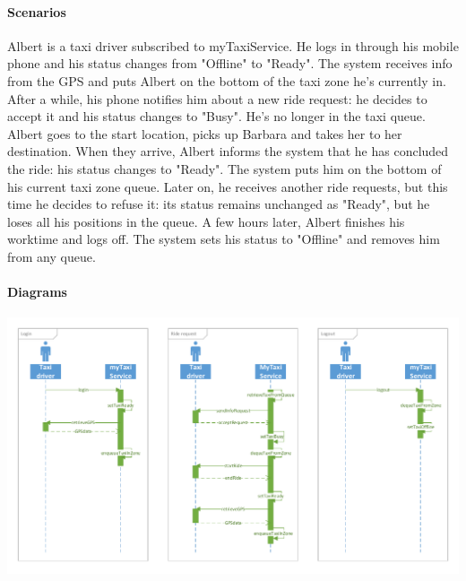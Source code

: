 \paragraph{Scenarios}
Albert is a taxi driver subscribed to myTaxiService. He logs in through his mobile phone and his status changes from "Offline" to "Ready". The system receives info from the GPS and puts Albert on the bottom of the taxi zone he's currently in. After a while, his phone notifies him about a new ride request: he decides to accept it and his status changes to "Busy". He's no longer in the taxi queue. Albert goes to the start location, picks up Barbara and takes her to her destination. When they arrive, Albert informs the system that he has concluded the ride: his status changes to "Ready". The system puts him on the bottom of his current taxi zone queue. Later on, he receives another ride requests, but this time he decides to refuse it: its status remains unchanged as "Ready", but he loses all his positions in the queue.
A few hours later, Albert finishes his worktime and logs off. The system sets his status to "Offline" and removes him from any queue.

\paragraph{Diagrams}
\begin{center}
	\includegraphics[width=\textwidth]{diagrams/availability}
\end{center}
